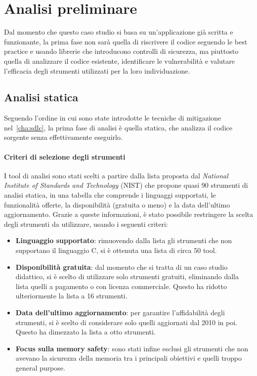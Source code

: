 \section{Analisi preliminare}
\label{sec:initial_analysis}

Dal momento che questo caso studio si basa su un'applicazione già scritta e funzionante,
la prima fase non sarà quella di riscrivere il codice seguendo le best practice
e usando librerie che introducono controlli di sicurezza, ma piuttosto quella di
analizzare il codice esistente, identificare le vulnerabilità e valutare l'efficacia
degli strumenti utilizzati per la loro individuazione.

\subsection*{Analisi statica}
Seguendo l'ordine in cui sono state introdotte le tecniche di mitigazione nel~\autoref{cha:sdlc},
la prima fase di analisi è quella statica, che analizza il codice sorgente senza
effettivamente eseguirlo.

\paragraph{Criteri di selezione degli strumenti}
I tool di analisi sono stati scelti a partire dalla lista proposta dal \textit{National
Institute of Standards and Technology} (NIST)\cite{nist_sast_list} che propone quasi
90 strumenti di analisi statica, in una tabella che comprende i linguaggi
supportati, le funzionalità offerte, la disponibilità (gratuita o meno) e la
data dell'ultimo aggiornamento. Grazie a queste informazioni, è stato possibile
restringere la scelta degli strumenti da utilizzare, usando i seguenti criteri:
\begin{itemize}
  \item \textbf{Linguaggio supportato}: rimuovendo dalla lista gli strumenti che
    non supportano il linguaggio C, si è ottenuta una lista di circa 50 tool.

  \item \textbf{Disponibilità gratuita}: dal momento che si tratta di un caso studio
    didattico, si è scelto di utilizzare solo strumenti gratuiti, eliminando dalla
    lista quelli a pagamento o con licenza commerciale. Questo ha ridotto
    ulteriormente la lista a 16 strumenti.

  \item \textbf{Data dell'ultimo aggiornamento}: per garantire l'affidabilità degli
    strumenti, si è scelto di considerare solo quelli aggiornati dal 2010 in poi.
    Questo ha dimezzato la lista a otto strumenti.

  \item \textbf{Focus sulla memory safety}: sono stati infine esclusi gli strumenti
    che non avevano la sicurezza della memoria tra i principali obiettivi e quelli
    troppo general purpose.
\end{itemize}

